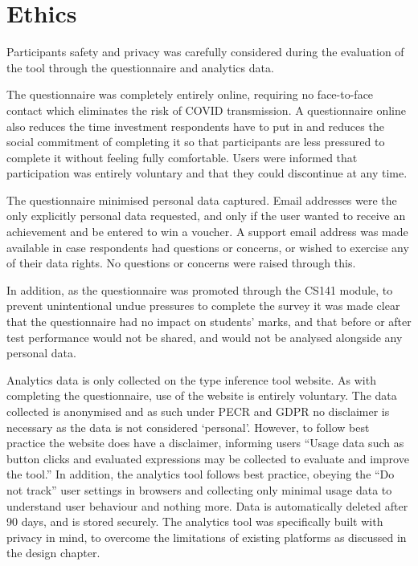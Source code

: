 \documentclass[a4paper,fleqn,oneside,12pt]{report}
\begin{document}
\section{Ethics}\label{id:h.q5st3bb4afm1}

Participants safety and privacy was carefully considered during the evaluation of the tool through the questionnaire and analytics data.

The questionnaire was completely entirely online, requiring no face-to-face contact which eliminates the risk of COVID transmission. A questionnaire online also reduces the time investment respondents have to put in and reduces the social commitment of completing it so that participants are less pressured to complete it without feeling fully comfortable. Users were informed that participation was entirely voluntary and that they could discontinue at any time.

The questionnaire minimised personal data captured. Email addresses were the only explicitly personal data requested, and only if the user wanted to receive an achievement and be entered to win a voucher. A support email address was made available in case respondents had questions or concerns, or wished to exercise any of their data rights. No questions or concerns were raised through this.

In addition, as the questionnaire was promoted through the CS141 module, to prevent unintentional undue pressures to complete the survey it was made clear that the questionnaire had no impact on students’ marks, and that before or after test performance would not be shared, and would not be analysed alongside any personal data.

Analytics data is only collected on the type inference tool website. As with completing the questionnaire, use of the website is entirely voluntary. The data collected is anonymised and as such under PECR and GDPR no disclaimer is necessary as the data is not considered ‘personal’. However, to follow best practice the website does have a disclaimer, informing users “Usage data such as button clicks and evaluated expressions may be collected to evaluate and improve the tool.” In addition, the analytics tool follows best practice, obeying the “Do not track” user settings in browsers and collecting only minimal usage data to understand user behaviour and nothing more. Data is automatically deleted after 90 days, and is stored securely. The analytics tool was specifically built with privacy in mind, to overcome the limitations of existing platforms as discussed in the design chapter.
\end{document}
